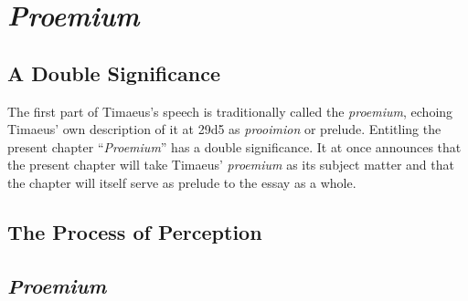 
\chapter{\emph{Proemium}} %
\label{cha:proemium}

\section{A Double Significance} %
\label{sec:a_double_significance}

The first part of Timaeus's speech is traditionally called the \emph{proemium}, echoing Timaeus' own description of it at 29d5 as \emph{prooimion} or prelude. Entitling the present chapter ``\emph{Proemium}'' has a double significance. It at once announces that the present chapter will take Timaeus' \emph{proemium} as its subject matter and that the chapter will itself serve as prelude to the essay as a whole.


\section{The Process of Perception} %
\label{sec:the_process_of_perception}




\section{\emph{Proemium}} %
\label{sec:proemium}




